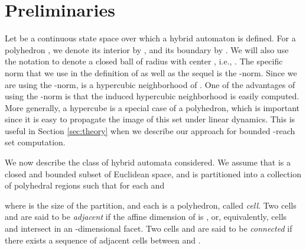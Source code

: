 \section{Preliminaries} \label{sec:pre}


Let   be a continuous state space over which a hybrid automaton is defined.
For a polyhedron , we denote its interior by , and its boundary by .
We will also use the notation  to denote a closed ball of radius  with center , i.e., . 
The specific norm that we use in the definition of  as well as the sequel is the -norm. 
Since we are using the -norm,  is a hypercubic neighborhood of .
One of the advantages of using the -norm is that the induced hypercubic neighborhood is easily computed. 
More generally, a hypercube is a special case of a polyhedron, which is important since it is easy to propagate the image of this set under linear dynamics.
This is useful in Section \ref{sec:theory} when we describe our approach for bounded -reach set computation.


We now describe the class of hybrid automata considered.
We assume that  is a closed and bounded subset of Euclidean space, and is partitioned into a collection of polyhedral regions  such that  for each  and 



where  is the size of the partition, and each  is a polyhedron, called \emph{cell}. 
Two cells  and  are said to be \emph{adjacent} if the affine dimension of  is , or, equivalently, cells  and  intersect in an -dimensional facet. 
Two cells  and  are said to be \emph{connected} if there exists a sequence of adjacent cells between  and .


